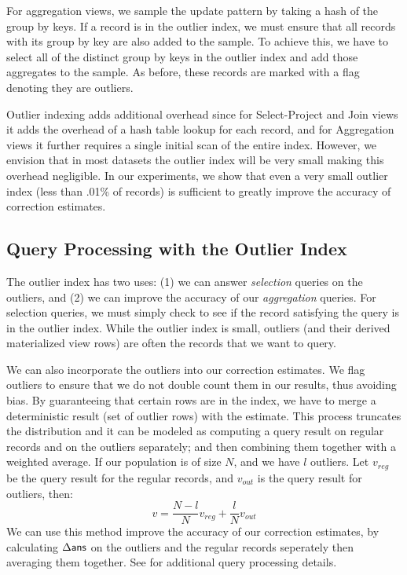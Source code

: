 For aggregation views, we sample the update pattern by taking a hash of the group by keys.
If a record is in the outlier index, we must ensure that all records with its group by key are also added to the sample.
To achieve this, we have to select all of the distinct group by keys in the outlier index and add those aggregates to the sample.
As before, these records are marked with a flag denoting they are outliers.

Outlier indexing adds additional overhead since for Select-Project and Join views it adds the overhead of a hash table lookup for each record, and for Aggregation views it further requires a single initial scan of the entire index. 
However, we envision that in most datasets the outlier index will be very small making this overhead negligible.
In our experiments, we show that even a very small outlier index (less than .01\% of records) is sufficient to greatly improve the accuracy of
correction estimates.

\subsection{Query Processing with the Outlier Index} 
The outlier index has two uses: (1) we can answer \emph{selection} queries on the outliers, 
and (2) we can improve the accuracy of our \emph{aggregation} queries.
For selection queries, we must simply check to see if the record satisfying the query is in the outlier index.
While the outlier index is small, outliers (and their derived materialized view rows) are often the records that
we want to query.

We can also incorporate the outliers into our correction estimates. 
We flag outliers to ensure that we do not double count them in our results, thus avoiding bias.
By guaranteeing that certain rows are in the index, we
have to merge a deterministic result (set of outlier rows) with the
estimate.
This process truncates the distribution and it can be modeled as computing a query
result on regular records and on the outliers separately; and then combining them together with
a weighted average. 
If our population is of size $N$, and we have $l$ outliers.
Let $v_{reg}$ be the query result for the regular records, and $v_{out}$ is the query result for outliers, then:
\[
 v = \frac{N-l}{N}v_{reg} + \frac{l}{N}v_{out}
\]
We can use this method improve the accuracy of our correction estimates, by calculating $\Delta\textsf{ans}$ 
on the outliers and the regular records seperately then averaging them together. 
See \cite{chaudhuri2001overcoming} for additional query processing details.